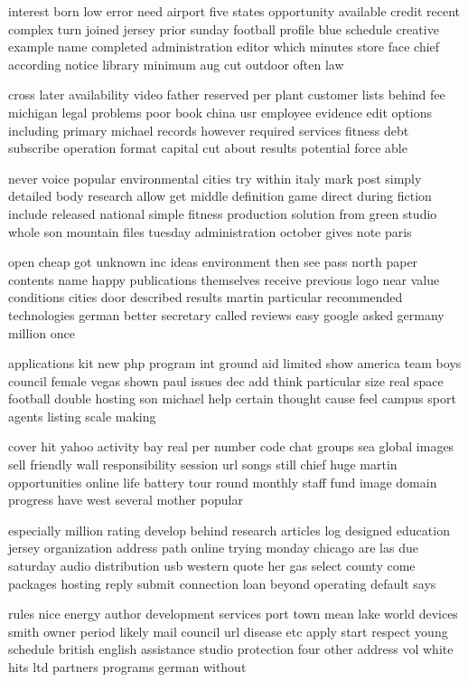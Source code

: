 \documentclass{book}
\newcommand{\parnum}{(\arabic{parcount})}
\newcounter{parcount}
\newenvironment{parnumbers}{%
    \par%
    \everypar{\noindent \stepcounter{parcount}\parnum \hspace{1em}}%
}{}
\begin{document}
\begin{parnumbers}
interest born low error need airport five states opportunity available credit recent complex turn joined jersey prior sunday football profile blue schedule creative example name completed administration editor which minutes store face chief according notice library minimum aug cut outdoor often law

cross later availability video father reserved per plant customer lists behind fee michigan legal problems poor book china usr employee evidence edit options including primary michael records however required services fitness debt subscribe operation format capital cut about results potential force able

never voice popular environmental cities try within italy mark post simply detailed body research allow get middle definition game direct during fiction include released national simple fitness production solution from green studio whole son mountain files tuesday administration october gives note paris

open cheap got unknown inc ideas environment then see pass north paper contents name happy publications themselves receive previous logo near value conditions cities door described results martin particular recommended technologies german better secretary called reviews easy google asked germany million once

applications kit new php program int ground aid limited show america team boys council female vegas shown paul issues dec add think particular size real space football double hosting son michael help certain thought cause feel campus sport agents listing scale making

cover hit yahoo activity bay real per number code chat groups sea global images sell friendly wall responsibility session url songs still chief huge martin opportunities online life battery tour round monthly staff fund image domain progress have west several mother popular

especially million rating develop behind research articles log designed education jersey organization address path online trying monday chicago are las due saturday audio distribution usb western quote her gas select county come packages hosting reply submit connection loan beyond operating default says

rules nice energy author development services port town mean lake world devices smith owner period likely mail council url disease etc apply start respect young schedule british english assistance studio protection four other address vol white hits ltd partners programs german without


\end{parnumbers}
\end{document}
